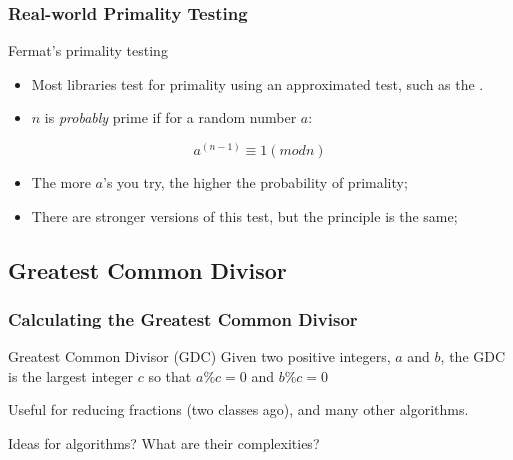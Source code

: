 \documentclass{beamer}
\begin{document}
\begin{frame}
  \frametitle{Real-world Primality Testing}
  {\small
  \begin{block}{Fermat's primality testing}
    \begin{itemize}
      \item Most libraries test for primality using an approximated
        test, such as the . 
      \item $n$ is \emph{probably} prime if for a random number $a$:
    \end{itemize}
  \end{block}
  \begin{equation*}
    a^{(n-1)} \equiv 1 ({mod} n)
  \end{equation*}
  \begin{block}{}
    \begin{itemize}
    \item The more $a$'s you try, the higher the probability of
      primality;
    \item There are stronger versions of this test, but the principle
      is the same;
    \end{itemize}
  \end{block}
  }
\end{frame}

\subsection{Greatest Common Divisor}
\begin{frame}
  \frametitle{Calculating the Greatest Common Divisor}
  
  \begin{block}{Greatest Common Divisor (GDC)}
    Given two positive integers, $a$ and $b$, the GDC is the largest
    integer $c$ so that $a\%c = 0$ and $b\%c = 0$
  \end{block}
  \vfill
  \begin{block}{}
    Useful for reducing fractions (two classes ago), and many other
    algorithms.
  \end{block}
  \begin{center}
    Ideas for algorithms? What are their complexities?
  \end{center}
\end{frame}
\end{document}
